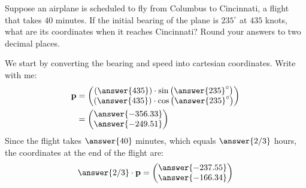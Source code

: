 \documentclass{ximera}
\author{Parisa Fatheddin \and Bart Snapp}
\begin{document}
\begin{exercise}
  Suppose an airplane is scheduled to fly from Columbus to Cincinnati, a
  flight that takes $40$ minutes.  If the initial bearing of the plane
  is $235^{\circ}$ at $435$ knots, what are its coordinates when it
  reaches Cincinnati? Round your answers to two decimal places.
  \begin{prompt}
    We start by converting the bearing and speed into cartesian
    coordinates. Write with me:
    \begin{align*}
      \vec{p} &=
                \begin{pmatrix}
                  \left(\answer{435}\right)\cdot\sin\left(\answer{235}^\circ\right)\\
                  \left(\answer{435}\right)\cdot\cos\left(\answer{235}^\circ\right)
                \end{pmatrix}\\
              &=\begin{pmatrix}
                \answer{-356.33} \\
                \answer{-249.51}
              \end{pmatrix}
    \end{align*}
    Since the flight takes $\answer{40}$ minutes,
    which equals $\answer{2/3}$ hours,
    the coordinates at the end of the
    flight are:
    \[
      \answer{2/3} \cdot \vec{p} = \begin{pmatrix}
        \answer{-237.55} \\
        \answer{-166.34}
      \end{pmatrix}
    \]
  \end{prompt}
\end{exercise}
\end{document}
